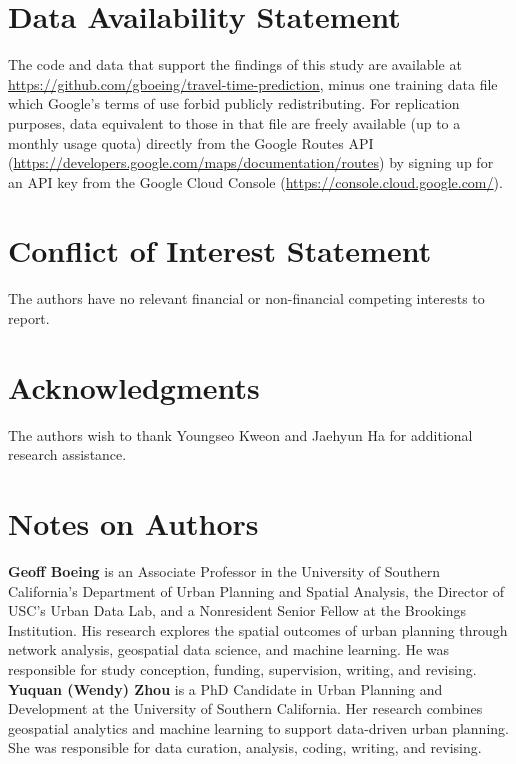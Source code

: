 \documentclass[12pt,letterpaper]{article} %
\begin{document}
\section*{Data Availability Statement}

The code and data that support the findings of this study are available at \url{https://github.com/gboeing/travel-time-prediction}, minus one training data file which Google's terms of use forbid publicly redistributing. For replication purposes, data equivalent to those in that file are freely available (up to a monthly usage quota) directly from the Google Routes API (\url{https://developers.google.com/maps/documentation/routes}) by signing up for an API key from the Google Cloud Console (\url{https://console.cloud.google.com/}).

\section*{Conflict of Interest Statement}

The authors have no relevant financial or non-financial competing interests to report.

\section*{Acknowledgments}

The authors wish to thank Youngseo Kweon and Jaehyun Ha for additional research assistance.

\section*{Notes on Authors}

\textbf{Geoff Boeing} is an Associate Professor in the University of Southern California's Department of Urban Planning and Spatial Analysis, the Director of USC's Urban Data Lab, and a Nonresident Senior Fellow at the Brookings Institution. His research explores the spatial outcomes of urban planning through network analysis, geospatial data science, and machine learning. He was responsible for study conception, funding, supervision, writing, and revising.
\newline\newline
\noindent\textbf{Yuquan (Wendy) Zhou} is a PhD Candidate in Urban Planning and Development at the University of Southern California. Her research combines geospatial analytics and machine learning to support data-driven urban planning. She was responsible for data curation, analysis, coding, writing, and revising.


\setlength{\bibsep}{0.00cm plus 0.05cm} %


\end{document}
